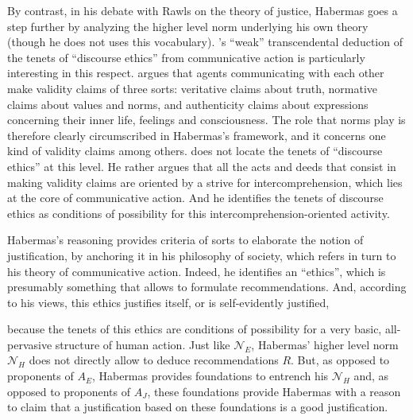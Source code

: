 \documentclass[preprint, french, english, 11pt, authoryear]{elsarticle}%
\newcommand{\acp}[1]{#1s}
\begin{document}
By contrast, in his debate with Rawls on the theory of justice, Habermas goes a step further by analyzing the higher level norm underlying his own theory (though he does not uses this vocabulary). 
\citet{habermas_moralbewustsein_1983}'s “weak” transcendental deduction of the tenets of “discourse ethics” from communicative action is particularly interesting in this respect. 
\citet{habermas_theorie_1981} argues that agents communicating with each other make validity claims of three sorts: veritative claims about truth, normative claims about values and norms, and authenticity claims about expressions concerning their inner life, feelings and consciousness. 
The role that norms play is therefore clearly circumscribed in Habermas's framework, and it concerns one kind of validity claims among others. 
\cite{habermas_moralbewustsein_1983} does not locate the tenets of “discourse ethics” at this level. 
He rather argues that all the acts and deeds that consist in making validity claims are oriented by a strive for intercomprehension, which lies at the core of communicative action. And he identifies the tenets of discourse ethics as conditions of possibility for this intercomprehension-oriented activity. 

Habermas's reasoning provides criteria of sorts to elaborate the notion of justification, by anchoring it in his philosophy of society, which refers in turn to his theory of communicative action. 
Indeed, he identifies an “ethics”, which is presumably something that allows to formulate recommendations. And, according to his views, this ethics justifies itself, or is self-evidently justified,

because the tenets of this ethics are conditions of possibility for a very basic, all-pervasive structure of human action. 
Just like $\mathscr{N}_E$, Habermas' higher level norm $\mathscr{N}_{H}$ does not directly allow to deduce recommendations $R$. 
But, as opposed to proponents of $A_E$, Habermas provides foundations to entrench his $\mathscr{N}_{H}$ and, as opposed to proponents of $A_J$, these foundations provide Habermas with a reason to claim that a justification based on these foundations is a good justification. 
\end{document}
